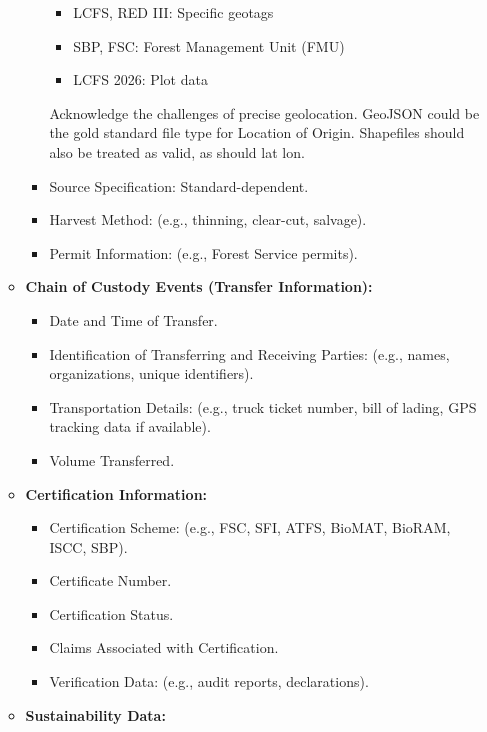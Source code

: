 \documentclass[a4paper, 11pt]{article}
\begin{document}
\begin{itemize}
\begin{itemize}
\begin{itemize}
\begin{itemize}
                            \item LCFS, RED III: Specific geotags
                            \item SBP, FSC: Forest Management Unit (FMU)
                            \item LCFS 2026: Plot data
                        \end{itemize}
                    Acknowledge the challenges of precise geolocation. GeoJSON could be the gold standard file type for Location of Origin. Shapefiles should also be treated as valid, as should lat lon. 
                    \item Source Specification: Standard-dependent.
                    \item Harvest Method: (e.g., thinning, clear-cut, salvage).
                    \item Permit Information: (e.g., Forest Service permits).
                \end{itemize}
            \item \textbf{Chain of Custody Events (Transfer Information):}
                \begin{itemize} 
                    \item Date and Time of Transfer.
                    \item Identification of Transferring and Receiving Parties: (e.g., names, organizations, unique identifiers).
                    \item Transportation Details: (e.g., truck ticket number, bill of lading, GPS tracking data if available).
                    \item Volume Transferred.
                \end{itemize}
            \item \textbf{Certification Information:}
                \begin{itemize} 
                    \item Certification Scheme: (e.g., FSC, SFI, ATFS, BioMAT, BioRAM, ISCC, SBP).
                    \item Certificate Number.
                    \item Certification Status.
                    \item Claims Associated with Certification.
                    \item Verification Data: (e.g., audit reports, declarations).
                \end{itemize}
            \item \textbf{Sustainability Data:}

\end{itemize}
\end{itemize}
\end{document}
